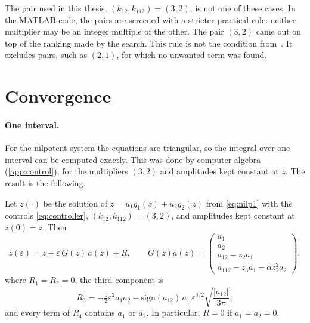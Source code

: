 The pair used in this thesis, $(k_{12},k_{112})=(3,2)$, is not one of these
cases. In the MATLAB code, the pairs are screened with a stricter practical rule:
neither multiplier may be an integer multiple of the other. The pair $(3,2)$ came
out on top of the ranking made by the search. This rule is not the condition
from~\cite{zuyev2024}. It excludes pairs, such as $(2,1)$, for which no unwanted
term was found.

\section{Convergence}
\label{sec:convergence}

\paragraph{One interval.}
For the nilpotent system the equations are triangular, so the integral over one
interval can be computed exactly. This was done by computer algebra
(\cref{app:control}), for the multipliers $(3,2)$ and amplitudes kept constant at
$z$. The result is the following.

\begin{lemma}
\label{lem:interval}
Let $z(\cdot)$ be the solution of $\dot z=u_1g_1(z)+u_2g_2(z)$ from
\eqref{eq:nilp1} with the controls \eqref{eq:controller},
$(k_{12},k_{112})=(3,2)$, and amplitudes kept constant at $z(0)=z$. Then
\begin{equation}
  z(\varepsilon)=z+\varepsilon\,G(z)\,a(z)+R,\qquad
  G(z)a(z)=\begin{pmatrix}a_1\\ a_2\\ a_{12}-z_2a_1\\ a_{112}-z_3a_1-\alpha z_2^2a_2\end{pmatrix},
  \label{eq:interval}
\end{equation}
where $R_1=R_2=0$, the third component is
\begin{equation}
  R_3=-\tfrac12\varepsilon^{2}a_1a_2-\mathrm{sign}(a_{12})\,a_1\,\varepsilon^{3/2}\sqrt{\frac{|a_{12}|}{3\pi}},
\end{equation}
and every term of $R_4$ contains $a_1$ or $a_2$. In particular, $R=0$ if
$a_1=a_2=0$.
\end{lemma}

